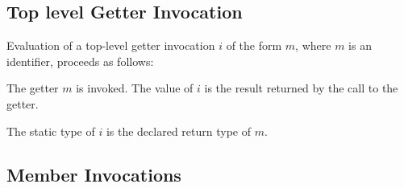 \documentclass[makeidx]{article}
\begin{document}
{\subsection{Top level Getter Invocation}

\LMHash{}%
Evaluation of a top-level getter invocation $i$ of the form $m$,
where $m$ is an identifier,
proceeds as follows:

\LMHash{}%
The getter $m$ is invoked.
The value of $i$ is the result returned by the call to the getter.

\LMHash{}%
The static type of $i$ is the declared return type of $m$.


\subsection{Member Invocations}

}
\end{document}
